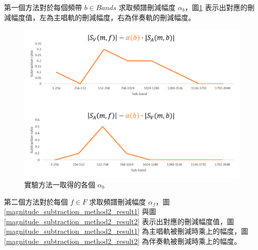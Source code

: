 第一個方法對於每個頻帶 $b\in Bands$ 求取頻譜刪減幅度 $\alpha_b$，圖\ref{magnitude_subtraction_method_result2} 表示出對應的刪減幅度值，左為主唱軌的刪減幅度，右為伴奏軌的刪減幅度。

\begin{figure}[htbp]
    \hfil
    \begin{minipage}[t]{0.6\textwidth}
        \includegraphics[width=\textwidth]{./figures/chapter05_result/magnitude_subtraction_method_result2.png}
        \caption {實驗方法一取得的各個 $\alpha_b$}
        \label{magnitude_subtraction_method_result2}
    \end{minipage}
    \hfil
\end{figure}

第二個方法對於每個 $f\in F$ 求取頻譜刪減幅度 $\alpha_f$，圖\ref{magnitude_subtraction_method2_result1} 與圖\ref{magnitude_subtraction_method2_result2}  表示出對應的刪減幅度值，圖\ref{magnitude_subtraction_method2_result1} 為主唱軌被刪減時乘上的幅度，圖\ref{magnitude_subtraction_method2_result2} 為伴奏軌被刪減時乘上的幅度。

